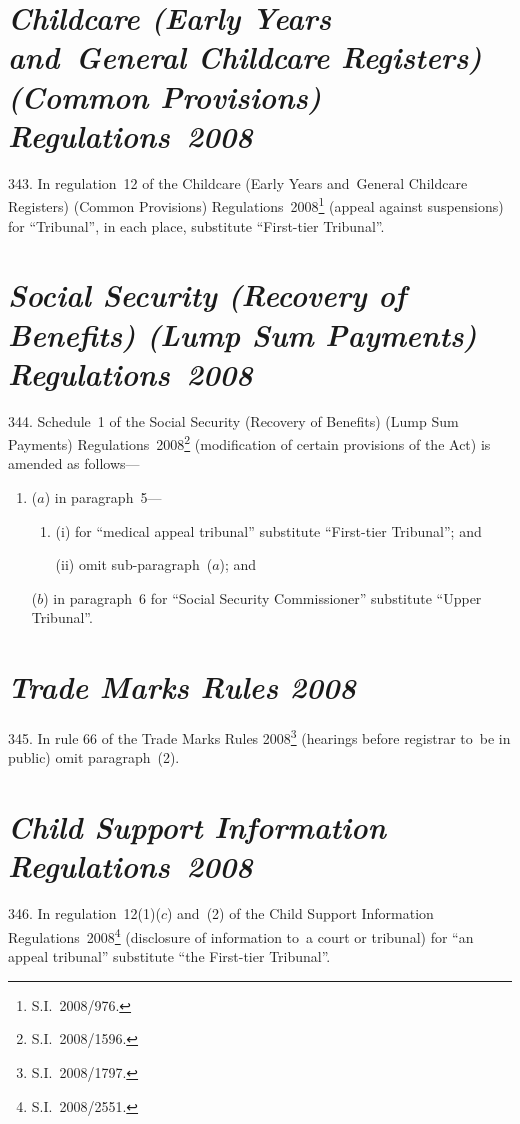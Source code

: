 \documentclass[12pt,a4paper]{article}
\begin{document}
\section*{\itshape Childcare (Early Years and~General Childcare Registers) (Common Provisions) Regulations~2008}

343.  In regulation~12 of the Childcare (Early Years and~General Childcare Registers) (Common Provisions) Regulations~2008\footnote{S.I.~2008/976.} (appeal against suspensions) for “Tribunal”, in each place, substitute “First-tier Tribunal”.

\section*{\itshape Social Security (Recovery of Benefits) (Lump Sum Payments) Regulations~2008}

344.  Schedule~1 of the Social Security (Recovery of Benefits) (Lump Sum Payments) Regulations~2008\footnote{S.I.~2008/1596.} (modification of certain provisions of the Act) is amended as follows—
\begin{enumerate}\item[]
($a$) in paragraph~5—
\begin{enumerate}\item[]
(i) for “medical appeal tribunal” substitute “First-tier Tribunal”; and

(ii) omit sub-paragraph~($a$); and
\end{enumerate}

($b$) in paragraph~6 for “Social Security Commissioner” substitute “Upper Tribunal”.
\end{enumerate}

\section*{\itshape Trade Marks Rules 2008}

345.  In rule 66 of the Trade Marks Rules 2008\footnote{S.I.\ 2008/1797.} (hearings before registrar to~be in public) omit paragraph~(2).

\section*{\itshape Child Support Information Regulations~2008}

346.  In regulation~12(1)($c$)  and~(2) of the Child Support Information Regulations~2008\footnote{S.I.~2008/2551.} (disclosure of information to~a court or tribunal) for “an appeal tribunal” substitute “the First-tier Tribunal”.
\end{document}
